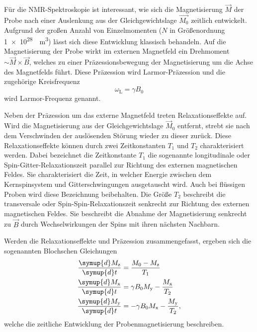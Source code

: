 Für die NMR-Spektroskopie ist interessant, wie sich die Magnetisierung $\vec{M}$
der Probe nach einer Auslenkung aus der Gleichgewichtslage $\vec{M_0}$
zeitlich entwickelt.
Aufgrund der großen Anzahl von Einzelmomenten
($N$ in Größenordnung \SI[retain-unity-mantissa=false]{1e28}{\per\cubic\meter})
lässt sich diese Entwicklung klassisch behandeln.
Auf die Magnetisierung der Probe wirkt im externen Magnetfeld ein Drehmoment
$\sim \vec{M} \times \vec{B}$,
welches zu einer Präzessionsbewegung der Magnetisierung um die Achse des
Magnetfelds führt.
Diese Präzession wird Larmor-Präzession und die zugehörige Kreisfrequenz
\begin{equation}
  \omega_\text{L} = \gamma B_0
  \label{eqn:LarmorFrequenz}
\end{equation}
wird Larmor-Frequenz genannt.

Neben der Präzession um das externe Magnetfeld treten Relaxationseffekte auf.
Wird die Magnetisierung aus der Gleichgewichtslage $\vec{M}_0$ entfernt,
strebt sie nach dem Verschwinden der auslösenden Störung wieder zu dieser zurück.
Diese Relaxationseffekte können durch zwei Zeitkonstanten $T_1$ und
$T_2$ charakterisiert werden.
Dabei bezeichnet die Zeitkonstante $T_1$ die sogenannte longitudinale oder
Spin-Gitter-Relaxationszeit parallel zur Richtung des externen magnetischen Feldes.
Sie charakterisiert die Zeit, in welcher Energie zwischen dem Kernspinsystem
und Gitterschwingungen ausgetauscht wird. Auch bei flüssigen Proben wird
diese Bezeichnung beibehalten.
Die Größe $T_2$ beschreibt die transversale oder Spin-Spin-Relaxationszeit
senkrecht zur Richtung des externen magnetischen Feldes.
Sie beschreibt die Abnahme der Magnetisierung senkrecht zu $\vec{B}$
durch Wechselwirkungen der Spins mit ihren nächsten Nachbarn.

Werden die Relaxationseffekte und Präzession zusammengefasst, ergeben sich
die sogenannten Blochschen Gleichungen
\begin{equation}
  \begin{split}
    \frac{\symup{d} M_\text{z}}{\symup{d} t} &= \frac{M_0 - M_\text{z}}{T_1} \\
    \frac{\symup{d} M_\text{x}}{\symup{d} t} &= 
      \gamma B_0 M_\text{y} - \frac{M_\text{x}}{T_2} \\
    \frac{\symup{d} M_\text{y}}{\symup{d} t} &=
      - \gamma B_0 M_\text{x} - \frac{M_\text{y}}{T_2},
  \end{split}
  \label{eqn:Bloch-Gleichungen}
\end{equation}
welche die zeitliche Entwicklung der Probenmagnetisierung beschreiben.


